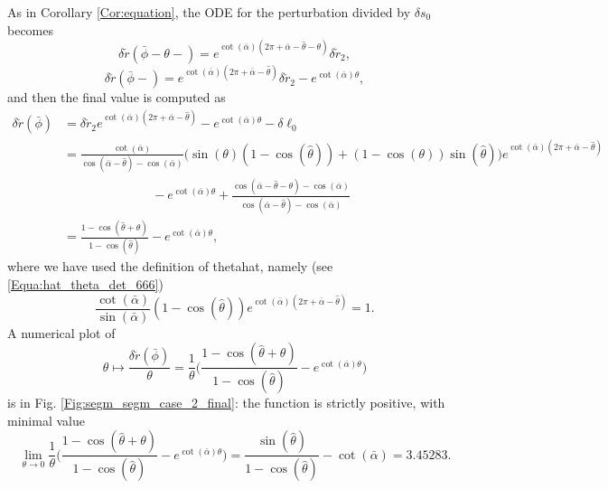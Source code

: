 \documentclass[reqno]{amsart}
\theoremstyle{definition} \newtheorem{definition}{Definition}[section]
\theoremstyle{definition} \newtheorem{remark}[definition]{Remark}
\theoremstyle{plain} \newtheorem{lemma}[definition]{Lemma}
\theoremstyle{plain} \newtheorem{proposition}[definition]{Proposition}
\theoremstyle{plain} \newtheorem{theorem}[definition]{Theorem}
\theoremstyle{plain} \newtheorem{corollary}[definition]{Corollary}
\theoremstyle{definition} \newtheorem{example}[definition]{Example}
\theoremstyle{plain} \newtheorem{claim}[clai]{Claim}
\theoremstyle{definition} \newtheorem{assumption}[definition]{Assumption}
\theoremstyle{definition} \newtheorem{observation}[definition]{Observation}
\newcommand{\1}{\mathbbm 1}
\numberwithin{equation}{section} %
\theoremstyle{plain} \newtheorem*{theorem*}{Theorem}
\theoremstyle{plain} \newtheorem{mthm}[maintheorem]{Main Theorem}
\theoremstyle{plain} \newtheorem*{mthm*}{Main Theorem}
\theoremstyle{plain} \newtheorem*{conjecture*}{Conjecture}
\theoremstyle{plain} \newtheorem{conjecture}[definition]{Conjecture}
\theoremstyle{plain} \newtheorem*{problem*}{Problem}
\begin{document}
As in Corollary \ref{Cor:equation}, the ODE for the perturbation divided by $\delta s_0$ becomes%
\begin{equation*}
\delta \check r(\bar \phi - \theta -) = e^{\cot(\bar \alpha) (2\pi + \bar \alpha - \hat \theta - \theta)} \delta \check r_2,
\end{equation*}
\begin{equation*}
\delta \check r(\bar \phi -) = e^{\cot(\bar \alpha) (2\pi + \bar \alpha - \hat \theta)} \delta \check r_2 - e^{\cot(\bar \alpha) \theta},
\end{equation*}
and then the final value is computed as
\begin{align*}
\delta \check r(\bar \phi) &= \delta \check r_2 e^{\cot(\bar \alpha) (2\pi + \bar \alpha - \hat \theta)} - e^{\cot(\bar \alpha) \theta} - \delta \ell_0 \\
&= \frac{\cot(\bar \alpha)}{\cos(\bar \alpha - \hat \theta) - \cos(\bar \alpha)} \big( \sin(\theta) (1 - \cos(\hat \theta)) + (1 - \cos(\theta)) \sin(\hat \theta) \big) e^{\cot(\bar \alpha) (2\pi + \bar \alpha - \hat \theta)} \\
& \quad \qquad \qquad \qquad - e^{\cot(\bar \alpha) \theta} + \frac{\cos(\bar \alpha - \hat \theta - \theta) - \cos(\bar \alpha)}{\cos(\bar \alpha - \hat \theta) - \cos(\bar \alpha)} \\
&= \frac{1 - \cos(\hat \theta + \theta)}{1 - \cos(\hat \theta)} - e^{\cot(\bar \alpha) \theta},
\end{align*}
where we have used the definition of \gls{thetahat}, namely (see \eqref{Equa:hat_theta_det_666})
$$
\frac{\cot(\bar \alpha)}{\sin(\bar \alpha)}(1 - \cos(\hat \theta)) e^{\cot(\bar \alpha)(2\pi + \bar \alpha - \hat \theta)} = 1.
$$
A numerical plot of
\begin{equation}
\label{Equa:segm_segm_2_final}
\theta \mapsto \frac{\delta \check r(\bar \phi)}{\theta} = \frac{1}{\theta} \bigg( \frac{1 - \cos(\hat \theta + \theta)}{1 - \cos(\hat \theta)} - e^{\cot(\bar \alpha) \theta} \bigg)
\end{equation}
is in Fig. \ref{Fig:segm_segm_case_2_final}: the function is strictly positive, with minimal value
\begin{equation*}
\lim_{\theta \to 0} \frac{1}{\theta} \bigg( \frac{1 - \cos(\hat \theta + \theta)}{1 - \cos(\hat \theta)} - e^{\cot(\bar \alpha) \theta} \bigg) = \frac{\sin(\hat \theta)}{1 - \cos(\hat \theta)} - \cot(\bar \alpha) = 3.45283.
\end{equation*}
\end{document}
